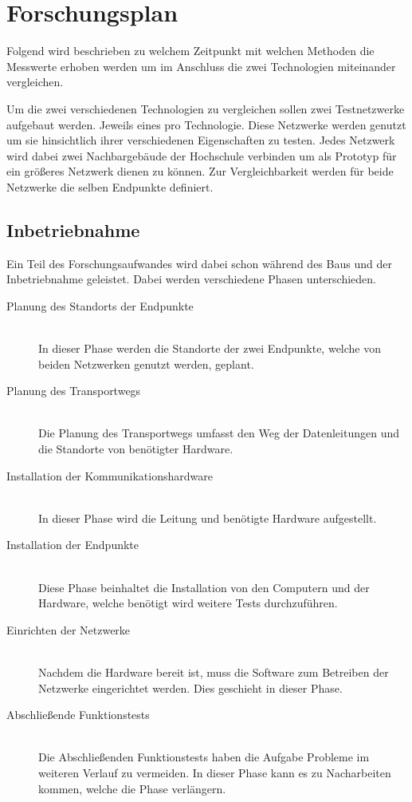 \chapter{Forschungsplan}

Folgend wird beschrieben zu welchem Zeitpunkt mit welchen Methoden die Messwerte erhoben werden um im Anschluss die zwei Technologien miteinander vergleichen.

Um die zwei verschiedenen Technologien zu vergleichen sollen zwei Testnetzwerke aufgebaut werden.
Jeweils eines pro Technologie.
Diese Netzwerke werden genutzt um sie hinsichtlich ihrer verschiedenen Eigenschaften zu testen.
Jedes Netzwerk wird dabei zwei Nachbargebäude der Hochschule verbinden um als Prototyp für ein größeres Netzwerk dienen zu können.
Zur Vergleichbarkeit werden für beide Netzwerke die selben Endpunkte definiert.

\section{Inbetriebnahme}\label{inbetriebnahme}

Ein Teil des Forschungsaufwandes wird dabei schon während des Baus und der Inbetriebnahme geleistet.
Dabei werden verschiedene Phasen unterschieden.

\begin{description}
    \item [Planung des Standorts der Endpunkte]\hfill \\
        In dieser Phase werden die Standorte der zwei Endpunkte, welche von beiden Netzwerken genutzt werden, geplant.
    \item [Planung des Transportwegs]\hfill \\
        Die Planung des Transportwegs umfasst den Weg der Datenleitungen und die Standorte von benötigter Hardware.
    \item [Installation der Kommunikationshardware]\hfill \\
        In dieser Phase wird die Leitung und benötigte Hardware aufgestellt.
    \item [Installation der Endpunkte]\hfill \\
        Diese Phase beinhaltet die Installation von den Computern und der Hardware, welche benötigt wird weitere Tests durchzuführen.
    \item [Einrichten der Netzwerke] \hfill \\
        Nachdem die Hardware bereit ist, muss die Software zum Betreiben der Netzwerke eingerichtet werden. Dies geschieht in dieser Phase.
    \item [Abschließende Funktionstests] \hfill \\
        Die Abschließenden Funktionstests haben die Aufgabe Probleme im weiteren Verlauf zu vermeiden.
        In dieser Phase kann es zu Nacharbeiten kommen, welche die Phase verlängern.
\end{description}

